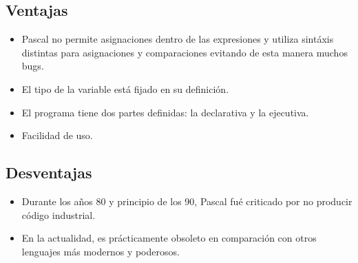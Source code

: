 \documentclass{IEEEtran}
\begin{document}
\subsection{Ventajas}
\begin{itemize}
\item Pascal no permite asignaciones dentro de las expresiones y utiliza sint\'axis distintas para asignaciones y comparaciones evitando de esta manera muchos bugs.
\item El tipo de la variable est\'a fijado en su definici\'on.
\item El programa tiene dos partes definidas: la declarativa y la ejecutiva.
\item Facilidad de uso.
\end{itemize}
\subsection{Desventajas}
\begin{itemize}
\item Durante los a\~nos 80 y principio de los 90, Pascal fu\'e criticado por no producir c\'odigo industrial.
\item En la actualidad, es pr\'acticamente obsoleto en comparaci\'on con otros lenguajes m\'as modernos y poderosos.
\end{itemize}
\end{document}
